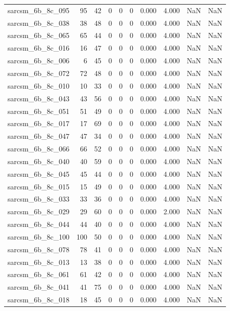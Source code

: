 \documentclass{article}
\begin{document}
\begin{longtable}{lrrrrrrrrr}
sarcsm\_6b\_8c\_095 & 95 & 42 & 0 & 0 & 0 & 0.000 & 4.000 & NaN & NaN \\
sarcsm\_6b\_8c\_038 & 38 & 48 & 0 & 0 & 0 & 0.000 & 4.000 & NaN & NaN \\
sarcsm\_6b\_8c\_065 & 65 & 44 & 0 & 0 & 0 & 0.000 & 4.000 & NaN & NaN \\
sarcsm\_6b\_8c\_016 & 16 & 47 & 0 & 0 & 0 & 0.000 & 4.000 & NaN & NaN \\
sarcsm\_6b\_8c\_006 & 6 & 45 & 0 & 0 & 0 & 0.000 & 4.000 & NaN & NaN \\
sarcsm\_6b\_8c\_072 & 72 & 48 & 0 & 0 & 0 & 0.000 & 4.000 & NaN & NaN \\
sarcsm\_6b\_8c\_010 & 10 & 33 & 0 & 0 & 0 & 0.000 & 4.000 & NaN & NaN \\
sarcsm\_6b\_8c\_043 & 43 & 56 & 0 & 0 & 0 & 0.000 & 4.000 & NaN & NaN \\
sarcsm\_6b\_8c\_051 & 51 & 49 & 0 & 0 & 0 & 0.000 & 4.000 & NaN & NaN \\
sarcsm\_6b\_8c\_017 & 17 & 69 & 0 & 0 & 0 & 0.000 & 4.000 & NaN & NaN \\
sarcsm\_6b\_8c\_047 & 47 & 34 & 0 & 0 & 0 & 0.000 & 4.000 & NaN & NaN \\
sarcsm\_6b\_8c\_066 & 66 & 52 & 0 & 0 & 0 & 0.000 & 4.000 & NaN & NaN \\
sarcsm\_6b\_8c\_040 & 40 & 59 & 0 & 0 & 0 & 0.000 & 4.000 & NaN & NaN \\
sarcsm\_6b\_8c\_045 & 45 & 44 & 0 & 0 & 0 & 0.000 & 4.000 & NaN & NaN \\
sarcsm\_6b\_8c\_015 & 15 & 49 & 0 & 0 & 0 & 0.000 & 4.000 & NaN & NaN \\
sarcsm\_6b\_8c\_033 & 33 & 36 & 0 & 0 & 0 & 0.000 & 4.000 & NaN & NaN \\
sarcsm\_6b\_8c\_029 & 29 & 60 & 0 & 0 & 0 & 0.000 & 2.000 & NaN & NaN \\
sarcsm\_6b\_8c\_044 & 44 & 40 & 0 & 0 & 0 & 0.000 & 4.000 & NaN & NaN \\
sarcsm\_6b\_8c\_100 & 100 & 50 & 0 & 0 & 0 & 0.000 & 4.000 & NaN & NaN \\
sarcsm\_6b\_8c\_078 & 78 & 41 & 0 & 0 & 0 & 0.000 & 4.000 & NaN & NaN \\
sarcsm\_6b\_8c\_013 & 13 & 38 & 0 & 0 & 0 & 0.000 & 4.000 & NaN & NaN \\
sarcsm\_6b\_8c\_061 & 61 & 42 & 0 & 0 & 0 & 0.000 & 4.000 & NaN & NaN \\
sarcsm\_6b\_8c\_041 & 41 & 75 & 0 & 0 & 0 & 0.000 & 4.000 & NaN & NaN \\
sarcsm\_6b\_8c\_018 & 18 & 45 & 0 & 0 & 0 & 0.000 & 4.000 & NaN & NaN \\

\end{longtable}
\end{document}
